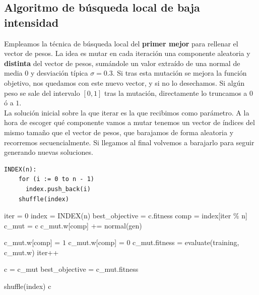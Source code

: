 \documentclass[12pt]{article}
\begin{document}
\subsection*{Algoritmo de búsqueda local de baja intensidad}
\label{bl}

Empleamos la técnica de búsqueda local del \textbf{primer mejor} para rellenar el vector de pesos. La idea es mutar en cada iteración una componente aleatoria y \textbf{distinta} del vector de pesos, sumándole un valor extraído de una normal de media $0$ y desviación típica $\sigma = 0.3$. Si tras esta mutación se mejora la función objetivo, nos quedamos con este nuevo vector, y si no lo desechamos. Si algún peso se sale del intervalo $[0,1]$ tras la mutación, directamente lo truncamos a $0$ ó a $1$.\\

La solución inicial sobre la que iterar es la que recibimos como parámetro. A la hora de escoger qué componente vamos a mutar tenemos un vector de índices del mismo tamaño que el vector de pesos, que barajamos de forma aleatoria y recorremos secuencialmente. Si llegamos al final volvemos a barajarlo para seguir generando nuevas soluciones.

\begin{verbatim}
INDEX(n):
    for (i := 0 to n - 1)
      index.push_back(i)
    shuffle(index)
\end{verbatim}

\begin{algorithm}[h!]
\begin{algorithmic}

    \State iter = 0
    \State index = INDEX(n) 
    \State best\_objective = c.fitness
        \State comp = index[iter $\%$ n]
        \State c\_mut = c
        \State c\_mut.w[comp] += normal(gen)
        
         \State c\_mut.w[comp] = $1$
         \State c\_mut.w[comp] = $0$
        \EndIf
        \State c\_mut.fitness = evaluate(training, c\_mut.w)
        \State iter++

          \State c = c\_mut
          \State best\_objective = c\_mut.fitness
        \EndIf

          \State shuffle(index)
        \EndIf
     \EndWhile
\State \Return c
\EndFunction

\end{algorithmic}
\end{algorithm}
\end{document}

